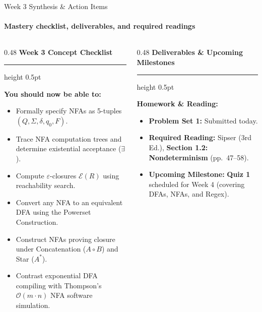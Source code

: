 \documentclass[aspectratio=169, 10pt]{beamer}
\newcommand{\colheader}[1]{%
  {\noindent\footnotesize\bfseries\color{gimpanavy}#1}%
  \vspace{0.02cm}%
  {\color{gimpanavy!30}\hrule height 0.5pt}%
  \vspace{0.05cm}%
}
\newcommand{\cardtitle}[1]{{\noindent\footnotesize\bfseries\color{gimpanavy}#1}\par\vspace{0.03cm}}
\newcommand{\greentitle}[1]{{\noindent\footnotesize\bfseries\color{accentGreen}#1}\par\vspace{0.03cm}}
\begin{document}
\begin{frame}{Week 3 Synthesis \& Action Items}
  \framesubtitle{Mastery checklist, deliverables, and required readings}
  
  \begin{columns}[T]
    \begin{column}{0.48\textwidth}
      \colheader{Week 3 Concept Checklist}
      \begin{tcolorbox}[conceptcard]
        \cardtitle{You should now be able to:}
        \begin{itemize}\setlength{\itemsep}{2pt}\scriptsize
          \item Formally specify NFAs as 5-tuples $(Q, \Sigma, \delta, q_0, F)$.
          \item Trace NFA computation trees and determine existential acceptance ($\exists$).
          \item Compute $\varepsilon$-closures $\mathcal{E}(R)$ using reachability search.
          \item Convert any NFA to an equivalent DFA using the Powerset Construction.
          \item Construct NFAs proving closure under Concatenation ($A \circ B$) and Star ($A^*$).
          \item Contrast exponential DFA compiling with Thompson's $\mathcal{O}(m \cdot n)$ NFA software simulation.
        \end{itemize}
      \end{tcolorbox}
    \end{column}
    
    \begin{column}{0.48\textwidth}
      \colheader{Deliverables \& Upcoming Milestones}
      \begin{tcolorbox}[examplecard]
        \greentitle{Homework \& Reading:}
        \begin{itemize}\setlength{\itemsep}{1.5pt}\scriptsize
          \item \textbf{Problem Set 1:} Submitted today.
          \item \textbf{Required Reading:} Sipser (3rd Ed.), \textbf{Section 1.2: Nondeterminism} (pp.~47--58).
          \item \textbf{Upcoming Milestone:} \textbf{Quiz 1} scheduled for Week 4 (covering DFAs, NFAs, and Regex).
        \end{itemize}
        \vspace{0.04cm}
        

\end{tcolorbox}
\end{column}
\end{columns}
\end{frame}
\end{document}
